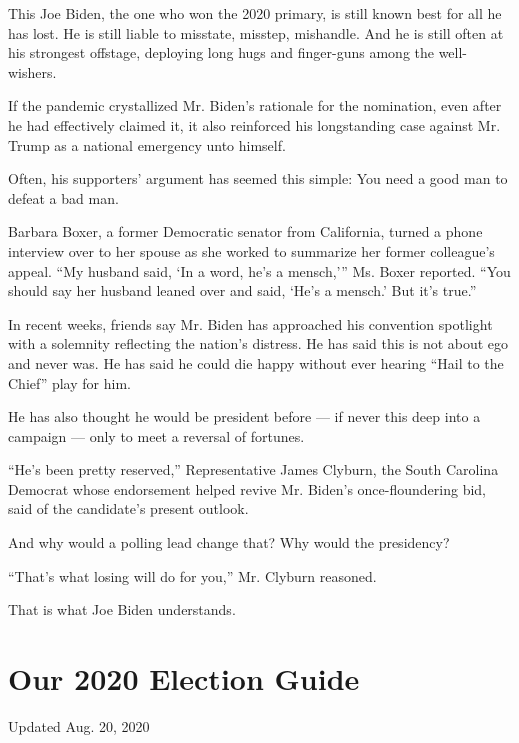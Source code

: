 This Joe Biden, the one who won the 2020 primary, is still known best
for all he has lost. He is still liable to misstate, misstep, mishandle.
And he is still often at his strongest offstage, deploying long hugs and
finger-guns among the well-wishers.

If the pandemic crystallized Mr. Biden's rationale for the nomination,
even after he had effectively claimed it, it also reinforced his
longstanding case against Mr. Trump as a national emergency unto
himself.

Often, his supporters' argument has seemed this simple: You need a good
man to defeat a bad man.

Barbara Boxer, a former Democratic senator from California, turned a
phone interview over to her spouse as she worked to summarize her former
colleague's appeal. ``My husband said, `In a word, he's a mensch,''' Ms.
Boxer reported. ``You should say her husband leaned over and said, `He's
a mensch.' But it's true.''

In recent weeks, friends say Mr. Biden has approached his convention
spotlight with a solemnity reflecting the nation's distress. He has said
this is not about ego and never was. He has said he could die happy
without ever hearing ``Hail to the Chief'' play for him.

He has also thought he would be president before --- if never this deep
into a campaign --- only to meet a reversal of fortunes.

``He's been pretty reserved,'' Representative James Clyburn, the South
Carolina Democrat whose endorsement helped revive Mr. Biden's
once-floundering bid, said of the candidate's present outlook.

And why would a polling lead change that? Why would the presidency?

``That's what losing will do for you,'' Mr. Clyburn reasoned.

That is what Joe Biden understands.

\hypertarget{our-2020-election-guide}{%
\section{Our 2020 Election Guide}\label{our-2020-election-guide}}

Updated Aug. 20, 2020

